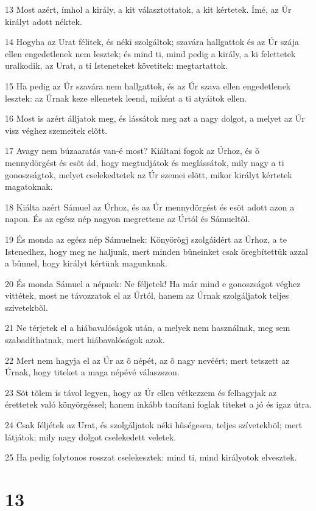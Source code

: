 \par 13 Most azért, ímhol a király, a kit választottatok, a kit kértetek. Ímé, az Úr királyt adott néktek.
\par 14 Hogyha az Urat félitek, és néki szolgáltok; szavára hallgattok és az Úr szája ellen engedetlenek nem lesztek; és mind ti, mind pedig a király, a ki felettetek uralkodik, az Urat, a ti Isteneteket követitek: megtartattok.
\par 15 Ha pedig az Úr szavára nem hallgattok, és az Úr szava ellen engedetlenek lesztek: az Úrnak keze ellenetek leend, miként a ti atyáitok ellen.
\par 16 Most is azért álljatok meg, és lássátok meg azt a nagy dolgot, a melyet az Úr visz véghez szemeitek elõtt.
\par 17 Avagy nem búzaaratás van-é most? Kiáltani fogok az Úrhoz, és õ mennydörgést és esõt ád, hogy megtudjátok és meglássátok, mily nagy a ti gonoszságtok, melyet cselekedtetek az Úr szemei elõtt, mikor királyt kértetek magatoknak.
\par 18 Kiálta azért Sámuel az Úrhoz, és az Úr mennydörgést és esõt adott azon a napon. És az egész nép nagyon megrettene az Úrtól és Sámueltõl.
\par 19 És monda az egész nép Sámuelnek: Könyörögj szolgáidért az Úrhoz, a te Istenedhez, hogy meg ne haljunk, mert minden bûneinket csak öregbítettük azzal a bûnnel, hogy királyt kértünk magunknak.
\par 20 És monda Sámuel a népnek: Ne féljetek! Ha már mind e gonoszságot véghez vittétek, most ne távozzatok el az Úrtól, hanem az Úrnak szolgáljatok teljes szívetekbõl.
\par 21 Ne térjetek el a hiábavalóságok után, a melyek nem használnak, meg sem szabadíthatnak, mert hiábavalóságok azok.
\par 22 Mert nem hagyja el az Úr az õ népét, az õ nagy nevéért; mert tetszett az Úrnak, hogy titeket a maga népévé válaszszon.
\par 23 Sõt tõlem is távol legyen, hogy az Úr ellen vétkezzem és felhagyjak az érettetek való könyörgéssel; hanem inkább tanítani foglak titeket a jó és igaz útra.
\par 24 Csak féljétek az Urat, és szolgáljatok néki hûségesen, teljes szívetekbõl; mert látjátok; mily nagy dolgot cselekedett veletek.
\par 25 Ha pedig folytonos rosszat cselekesztek: mind ti, mind királyotok elvesztek.

\chapter{13}


